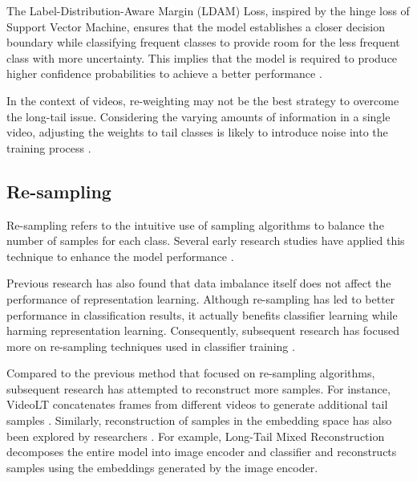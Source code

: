 The Label-Distribution-Aware Margin (LDAM) Loss, inspired by the hinge loss of Support Vector Machine, ensures that the model establishes a closer decision boundary while classifying frequent classes to provide room for the less frequent class with more uncertainty. This implies that the model is required to produce higher confidence probabilities to achieve a better performance \parencite{cao2019learning}.


In the context of videos, re-weighting may not be the best strategy to overcome the long-tail issue. Considering the varying amounts of information in a single video, adjusting the weights to tail classes is likely to introduce noise into the training process \parencite{zhang2021videolt}.

\subsection{Re-sampling}
Re-sampling refers to the intuitive use of sampling algorithms to balance the number of samples for each class. Several early research studies have applied this technique to enhance the model performance \parencite{shen2016relay, 5128907, mahajan2018exploring}.

Previous research has also found that data imbalance itself does not affect the performance of representation learning. Although re-sampling has led to better performance in classification results, it actually benefits classifier learning while harming representation learning. Consequently, subsequent research has focused more on re-sampling techniques used in classifier training \parencite{zhou2020bbn, kang2019decoupling}.

Compared to the previous method that focused on re-sampling algorithms, subsequent research has attempted to reconstruct more samples. For instance, VideoLT concatenates frames from different videos to generate additional tail samples \parencite{zhang2021videolt}. Similarly, reconstruction of samples in the embedding space has also been explored by researchers \parencite{liu2022long, perrett2023use}. For example, Long-Tail Mixed Reconstruction \parencite{perrett2023use} decomposes the entire model into image encoder and classifier and reconstructs samples using the embeddings generated by the image encoder.

